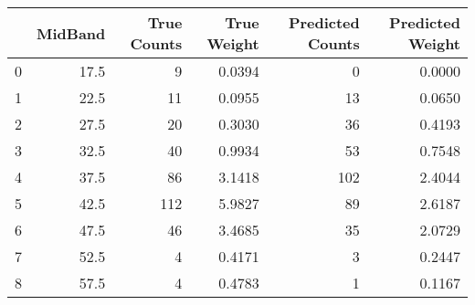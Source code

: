 \begin{tabular}{lrrrrr}
\toprule
{} &  MidBand &  True Counts &  True Weight &  Predicted Counts &  Predicted Weight \\
\midrule
0 &     17.5 &            9 &       0.0394 &                 0 &            0.0000 \\
1 &     22.5 &           11 &       0.0955 &                13 &            0.0650 \\
2 &     27.5 &           20 &       0.3030 &                36 &            0.4193 \\
3 &     32.5 &           40 &       0.9934 &                53 &            0.7548 \\
4 &     37.5 &           86 &       3.1418 &               102 &            2.4044 \\
5 &     42.5 &          112 &       5.9827 &                89 &            2.6187 \\
6 &     47.5 &           46 &       3.4685 &                35 &            2.0729 \\
7 &     52.5 &            4 &       0.4171 &                 3 &            0.2447 \\
8 &     57.5 &            4 &       0.4783 &                 1 &            0.1167 \\
\bottomrule
\end{tabular}

